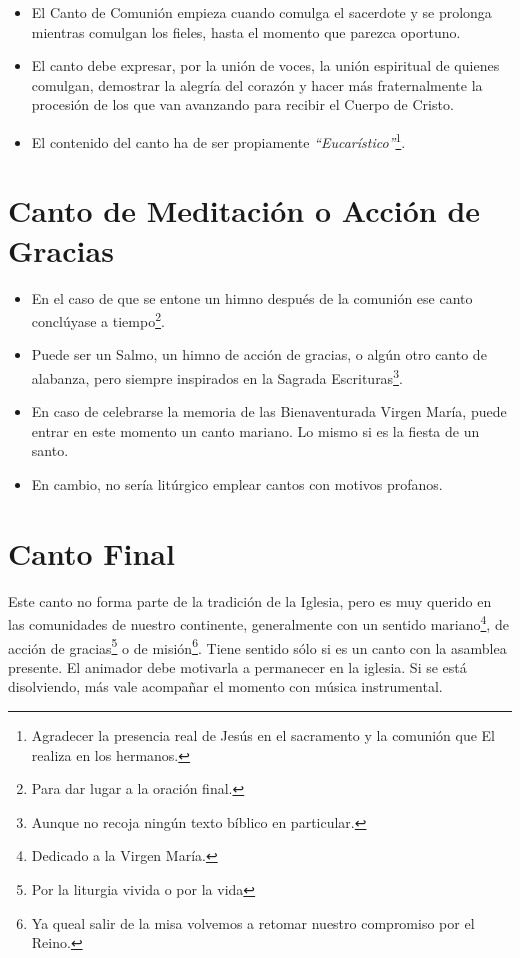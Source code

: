 \documentclass[letterpaper, 12pt]{book}
\begin{document}
    \begin{itemize}
        \item El Canto de Comuni\'on empieza cuando comulga el sacerdote y se prolonga mientras comulgan los fieles, hasta el momento que parezca oportuno.
        \item El canto debe expresar, por la uni\'on de voces, la uni\'on espiritual de quienes comulgan, demostrar la alegr\'ia del coraz\'on y hacer m\'as fraternalmente la procesi\'on de los que van avanzando para recibir el Cuerpo de Cristo.
        \item El contenido del canto ha de ser propiamente \textit{``Eucar\'istico''}\footnote{Agradecer la presencia real de Jes\'us en el sacramento y la comuni\'on que El realiza en los hermanos.}.
    \end{itemize}

    \section{Canto de Meditaci\'on o Acci\'on de Gracias}
    
    \begin{itemize}
        \item En el caso de que se entone un himno despu\'es de la comuni\'on ese canto concl\'uyase a tiempo\footnote{Para dar lugar a la oraci\'on final.}.
        \item Puede ser un Salmo, un himno de acci\'on de gracias, o alg\'un otro canto de alabanza, pero siempre inspirados en la Sagrada Escrituras\footnote{Aunque no recoja ning\'un texto b\'iblico en particular.}.
        \item En caso de celebrarse la memoria de las Bienaventurada Virgen Mar\'ia, puede entrar en este momento un canto mariano. Lo mismo si es la fiesta de un santo.
        \item En cambio, no ser\'ia lit\'urgico emplear cantos con motivos profanos.
    \end{itemize}
    
    \section{Canto Final}
    Este canto no forma parte de la tradici\'on de la Iglesia, pero es muy querido en las comunidades de nuestro continente, generalmente con un sentido mariano\footnote{Dedicado a la Virgen Mar\'ia.}, de acci\'on de gracias\footnote{Por la liturgia vivida o por la vida} o de misi\'on\footnote{Ya queal salir de la misa volvemos a retomar nuestro compromiso por el Reino.}. Tiene sentido s\'olo si es un canto con la asamblea presente. El animador debe motivarla a permanecer en la iglesia. Si se está disolviendo, m\'as vale acompa\~nar el momento con m\'usica instrumental.
\end{document}
